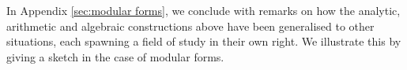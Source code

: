 \documentclass[a4paper,10pt, english, reqno]{smfart}
\newcommand{\GL}{\mathrm{GL}}
\numberwithin{equation}{section}
\begin{document}
 In Appendix \ref{sec:modular forms}, we conclude with remarks on how the analytic, arithmetic and algebraic constructions above have been generalised to other situations, each spawning a field of study in their own right. We illustrate this by giving a sketch in the case of modular forms. 



	
	

\end{document}
